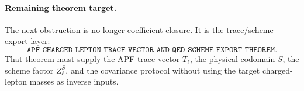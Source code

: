 \paragraph{Remaining theorem target.}
The next obstruction is no longer coefficient closure.  It is the trace/scheme
export layer:
\[
        \boxed{\texttt{APF\_CHARGED\_LEPTON\_TRACE\_VECTOR\_AND\_QED\_SCHEME\_EXPORT\_THEOREM}.}
\]
That theorem must supply the APF trace vector $T_\ell$, the physical codomain
$S$, the scheme factor $Z_\ell^S$, and the covariance protocol without using the
target charged-lepton masses as inverse inputs.
